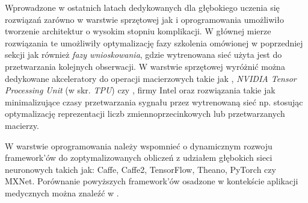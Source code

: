 Wprowadzone w ostatnich latach dedykowanych dla głębokiego uczenia się rozwiązań zarówno w warstwie sprzętowej jak i oprogramowania umożliwiło tworzenie architektur o wysokim stopniu komplikacji. W głównej mierze rozwiązania te umożliwiły optymalizację fazy szkolenia omówionej w poprzedniej sekcji jak również \textit{fazy wnioskowania}, gdzie wytrenowana sieć użyta jest do przetwarzania kolejnych obserwacji. W warstwie sprzętowej wyróżnić można dedykowane akceleratory do operacji macierzowych takie jak \cite{DBLP:journals/corr/abs-1803-04014}, \textit{NVIDIA Tensor Processing Unit} (w skr. \textit{TPU}) czy \cite{Intel}, firmy Intel oraz rozwiązania takie jak \cite{TensorRT} minimalizujące czasy przetwarzania sygnału przez wytrenowaną sieć np. stosując optymalizację reprezentacji liczb zmiennoprzecinkowych lub przetwarzanych macierzy. 

W warstwie oprogramowania należy wspomnieć o dynamicznym rozwoju framework'ów do zoptymalizowanych obliczeń z udziałem głębokich sieci neuronowych takich jak: Caffe, Caffe2, TensorFlow, Theano, PyTorch czy MXNet. Porównanie powyższych framework'ów osadzone w kontekście aplikacji medycznych można znaleźć w \cite{Erickson2017}.

